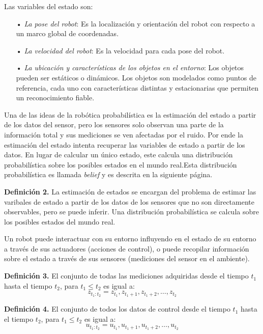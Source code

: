 Las variables del estado son:
\begin{itemize}
\item[•] \textit{La pose del robot}: Es la localización y orientación del robot con respecto a un marco global de coordenadas.
\item[•] \textit{La velocidad del robot}: Es la velocidad para cada pose del robot.
\item[•] \textit{La ubicación y características de los objetos en el entorno}: Los objetos pueden ser estáticos o dinámicos. Los objetos son modelados como puntos de referencia, cada uno con características distintas y estacionarias que permiten un reconocimiento fiable.
\end{itemize}

Una de las ideas de la robótica probabilística es la estimación del estado a partir de los datos del sensor, pero los sensores solo observan una parte de la información total y sus mediciones se ven afectadas por el ruido. Por ende la estimación del estado intenta recuperar las variables de estado a partir de los datos. En lugar de calcular un único estado, este calcula una distribución probabilística sobre los posibles estados en el mundo real.Esta distribución probabilística es llamada \textit{belief} y es descrita en la siguiente página.

\textbf{Definición 2.} La estimación de estados se encargan del problema de estimar las varibales de estado a partir de los datos de los sensores que no son directamente observables, pero se puede inferir. Una distribución probabilística se calcula sobre los posibles estados del mundo real.

Un robot puede interactuar con su entorno influyendo en el estado de su entorno a través de sus actuadores (acciones de control), o puede recopilar información sobre el estado a través de sus sensores (mediciones del sensor en el ambiente).

\textbf{Definición 3.} El conjunto de todas las mediciones adquiridas desde el tiempo $t_{1}$ hasta el tiempo $t_{2}$, para $t_{1} \leqslant t_{2}$ es igual a:
\begin{equation}
z_{t_{1}:t_{2}} = z_{t_{1}}, z_{t_{1} + 1}, z_{t_{1} + 2}, \ldots , z_{t_{2}}
\end{equation}
 
\textbf{Definición 4.} El conjunto de todos los datos de control desde el tiempo $t_{1}$ hasta el tiempo $t_{2}$, para $t_{1} \leqslant t_{2}$ es igual a:
\begin{equation}
u_{t_{1}:t_{2}} = u_{t_{1}},u_{t_{1} + 1}, u_{t_{1} + 2}, \ldots , u_{t_{2}}
\end{equation}

